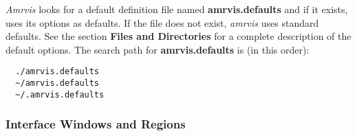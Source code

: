 {\em Amrvis} looks for a default definition file named  {\bf amrvis.defaults}
and if it exists, uses its options as defaults.
If the file does not exist, {\em amrvis} uses standard defaults.
See the section {\bf Files and Directories} for a complete description
of the default options.
The search path for {\bf amrvis.defaults} is (in this order):

\begin{verbatim}
  ./amrvis.defaults
  ~/amrvis.defaults
  ~/.amrvis.defaults
\end{verbatim}



\subsubsection{Interface Windows and Regions}

